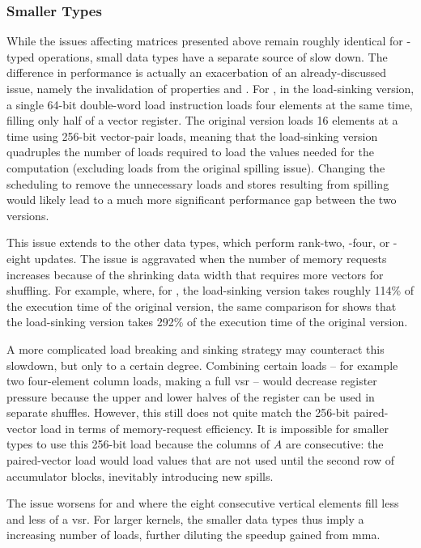 \documentclass[\main/thesis.tex]{subfiles}
\begin{document}
\subsubsection{Smaller Types}
While the issues affecting  matrices presented above remain roughly identical for -typed operations, small data types have a separate source of slow down.
The difference in performance is actually an exacerbation of an already-discussed issue, namely the invalidation of properties  and .
For , in the load-sinking version, a single 64-bit double-word load instruction loads four  elements at the same time, filling only half of a vector register.
The original version loads 16 elements at a time using 256-bit vector-pair loads, meaning that the load-sinking version quadruples the number of loads required to load the values needed for the computation (excluding loads from the original spilling issue).
Changing the scheduling to remove the unnecessary loads and stores resulting from spilling would likely lead to a much more significant performance gap between the two versions.

This issue extends to the other data types, which perform rank-two, -four, or -eight updates.
The issue is aggravated when the number of memory requests increases because of the shrinking data width that requires more vectors for shuffling.
For example, where, for , the load-sinking version takes roughly 114\% of the execution time of the original version, the same comparison for  shows that the load-sinking version takes 292\% of the execution time of the original version.

A more complicated load breaking and sinking strategy may counteract this slowdown, but only to a certain degree.
Combining certain loads -- for example two four-element  column loads, making a full \gls{vsr} -- would decrease register pressure because the upper and lower halves of the register can be used in separate shuffles.
However, this still does not quite match the 256-bit paired-vector load in terms of memory-request efficiency.
It is impossible for smaller types to use this 256-bit load because the columns of $A$ are consecutive: the paired-vector load would load values that are not used until the second row of accumulator blocks, inevitably introducing new spills.

The issue worsens for  and  where the eight consecutive vertical elements fill less and less of a \gls{vsr}.
For larger kernels, the smaller data types thus imply a increasing number of loads, further diluting the speedup gained from \gls{mma}.
\end{document}
